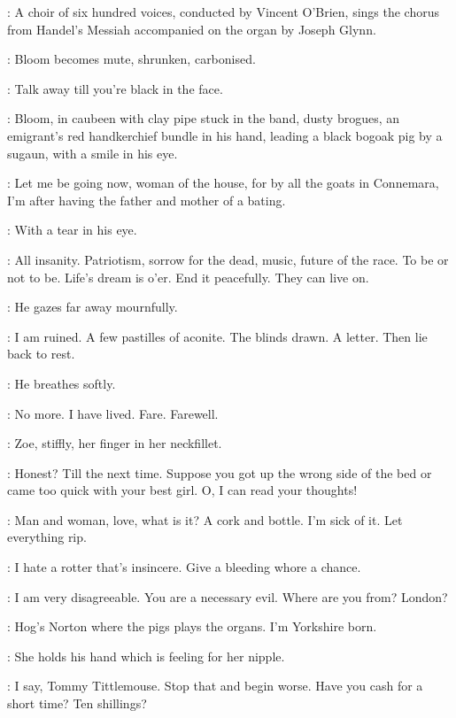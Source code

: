 :
A choir of six hundred voices, conducted by Vincent O'Brien,
sings the chorus from Handel's Messiah
accompanied on the organ by Joseph Glynn.

:
Bloom becomes mute, shrunken, carbonised.

\par

\Zoe[2]:
Talk away till you're black in the face.

:
Bloom, in caubeen with clay pipe stuck in the band, dusty brogues,
an emigrant's red handkerchief bundle in his hand,
leading a black bogoak pig by a sugaun, with a smile in his eye.

\Bloom:
Let me be going now, woman of the house,
for by all the goats in Connemara,
I'm after having the father and mother of a bating.

:
With a tear in his eye.

\Bloom:
All insanity.
Patriotism, sorrow for the dead, music, future of the race.
To be or not to be.
Life's dream is o'er.
End it peacefully.
They can live on.

:
He gazes far away mournfully.

\Bloom:
I am ruined.
A few pastilles of aconite.
The blinds drawn.
A letter.
Then lie back to rest.

:
He breathes softly.

\Bloom:
No more.
I have lived.
Fare. Farewell.

:
Zoe, stiffly, her finger in her neckfillet.

\Zoe:
Honest?
Till the next time.
Suppose you got up the wrong side of the bed or came too quick with your best girl.
O, I can read your thoughts!

\Bloom:
Man and woman, love, what is it?
A cork and bottle.
I'm sick of it.
Let everything rip.

\Zoe:
I hate a rotter that's insincere.
Give a bleeding whore a chance.

\Bloom:
I am very disagreeable.
You are a necessary evil.
Where are you from?
London?

\Zoe:
Hog's Norton where the pigs plays the organs.
I'm Yorkshire born.

:
She holds his hand which is feeling for her nipple.

\Zoe:
I say, Tommy Tittlemouse.
Stop that and begin worse.
Have you cash for a short time?
Ten shillings?

